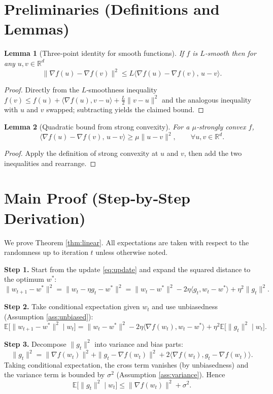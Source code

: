 \documentclass[11pt]{article}
\newtheorem{lemma}{Lemma}
\newcommand{\E}{\mathbb{E}}
\newcommand{\R}{\mathbb{R}}
\begin{document}
\newpage
\section*{Preliminaries (Definitions and Lemmas)}
\begin{lemma}[Three‑point identity for smooth functions]\label{lem:smooth}
If $f$ is $L$‑smooth then for any $u,v\in\R^{d}$
\[
\|\nabla f(u)-\nabla f(v)\|^{2}\le L\langle\nabla f(u)-\nabla f(v),\,u-v\rangle.
\tag{2}
\]
\end{lemma}
\begin{proof}
Directly from the $L$‑smoothness inequality
$f(v)\le f(u)+\langle\nabla f(u),v-u\rangle+\frac{L}{2}\|v-u\|^{2}$
and the analogous inequality with $u$ and $v$ swapped; subtracting yields the claimed bound. \qedhere
\end{proof}

\begin{lemma}[Quadratic bound from strong convexity]\label{lem:strong}
For a $\mu$‑strongly convex $f$,
\[
\langle\nabla f(u)-\nabla f(v),\,u-v\rangle\ge\mu\|u-v\|^{2},
\qquad\forall u,v\in\R^{d}.
\tag{3}
\]
\end{lemma}
\begin{proof}
Apply the definition of strong convexity at $u$ and $v$, then add the two inequalities and rearrange. \qedhere
\end{proof}

\section*{Main Proof (Step‑by‑Step Derivation)}
We prove Theorem \ref{thm:linear}.  
All expectations are taken with respect to the randomness up to iteration $t$ unless otherwise noted.

\bigskip
\noindent\textbf{Step 1.} Start from the update \eqref{eq:update} and expand the squared distance to the optimum $w^{*}$:
\[
\|w_{t+1}-w^{*}\|^{2}
= \|w_{t}-\eta g_{t}-w^{*}\|^{2}
= \|w_{t}-w^{*}\|^{2} -2\eta\langle g_{t},w_{t}-w^{*}\rangle +\eta^{2}\|g_{t}\|^{2}.
\tag{4}
\]

\noindent\textbf{Step 2.} Take conditional expectation given $w_{t}$ and use unbiasedness (Assumption \ref{ass:unbiased}):
\[
\E\!\big[\|w_{t+1}-w^{*}\|^{2}\mid w_{t}\big]
= \|w_{t}-w^{*}\|^{2} -2\eta\langle \nabla f(w_{t}),w_{t}-w^{*}\rangle
+ \eta^{2}\E\!\big[\|g_{t}\|^{2}\mid w_{t}\big].
\tag{5}
\]

\noindent\textbf{Step 3.} Decompose $\|g_{t}\|^{2}$ into variance and bias parts:
\[
\|g_{t}\|^{2}= \|\nabla f(w_{t})\|^{2}
+ \|g_{t}-\nabla f(w_{t})\|^{2}
+2\langle\nabla f(w_{t}),g_{t}-\nabla f(w_{t})\rangle.
\]
Taking conditional expectation, the cross term vanishes (by unbiasedness) and the variance term is bounded by $\sigma^{2}$ (Assumption \ref{ass:variance}). Hence
\[
\E\!\big[\|g_{t}\|^{2}\mid w_{t}\big]\le \|\nabla f(w_{t})\|^{2}+\sigma^{2}.
\tag{6}
\]
\end{document}
